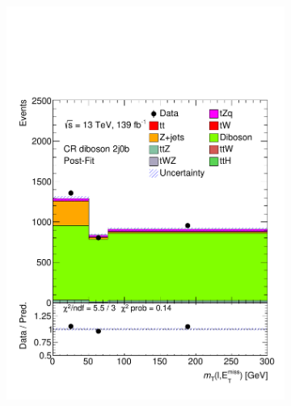 \begin{figure}[!h]
\begin{subfigure}[b]{0.33\linewidth}
    \includegraphics[width=\textwidth]{ubonn-thesis/Chapters/Chapters_07/Figure/Data/CR_2j0b_postFit.pdf} 
    \caption{}
  \end{subfigure} 
  \begin{subfigure}[b]{0.33\linewidth}
    \centering

\end{subfigure}
\end{figure}
